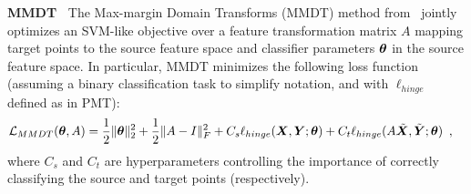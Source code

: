 {\bf MMDT~\cite{hoffman-iclr13}}
\newcommand{\mat}[1]{#1}
\newcommand\datransform{\mat{A}}
The Max-margin Domain Transforms (MMDT) method from~\cite{hoffman-iclr13} jointly optimizes an SVM-like objective over a feature transformation matrix $\datransform$ mapping target points to the source feature space and classifier parameters $\bm{\theta}$ in the source feature space.
In particular, MMDT minimizes the following loss function (assuming a binary classification task to simplify notation, and with
$\ell_{hinge}$
defined as in PMT):
\begin{align}
\mathcal{L}_{MMDT}(\svmT, \datransform)
&=
\frac{1}{2} \| \svmT \|^2_2
+
\frac{1}{2} \| \datransform - \mat{I} \|^2_F
+
C_s
\ell_{hinge}(\bm{X}, \bm{Y}; \svmT)
+
C_t
\ell_{hinge}(\datransform \tilde{\bm{X}}, \tilde{\bm{Y}}; \svmT)
\enspace,
\end{align}
where $C_s$ and $C_t$ are hyperparameters controlling the importance of correctly classifying the source and target points (respectively).



